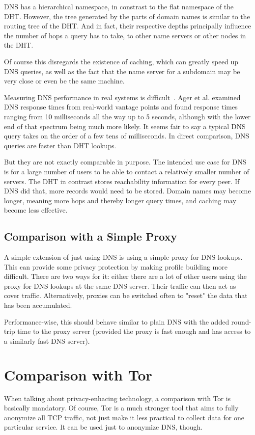 DNS has a hierarchical namespace, in constrast to the flat namespace of the DHT.
However, the tree generated by the parts of domain names is similar to the
routing tree of the DHT. And in fact, their respective depths principally
influence the number of hops a query has to take, to other name servers or other
nodes in the DHT.

Of course this disregards the existence of caching, which can greatly speed up
DNS queries, as well as the fact that the name server for a subdomain may be
very close or even be the same machine.

Measuring DNS performance in real systems is
difficult~\cite{liston2002diversity}. Ager et al.\cite{ager2010comparing}
examined DNS response times from real-world vantage points and found response
times ranging from 10 milliseconds all the way up to 5 seconds, although with
the lower end of that spectrum being much more likely. It seems fair to say a
typical DNS query takes on the order of a few tens of milliseconds. In direct
comparison, DNS queries are faster than DHT lookups.

But they are not exactly comparable in purpose. The intended use case for DNS is
for a large number of users to be able to contact a relatively smaller number of
servers. The DHT in contrast stores reachability information for every peer. If
DNS did that, more records would need to be stored. Domain names may become
longer, meaning more hops and thereby longer query times, and caching may become
less effective.

\subsection{Comparison with a Simple Proxy}
A simple extension of just using DNS is using a simple proxy for DNS lookups.
This can provide some privacy protection by making profile building more
difficult. There are two ways for it: either there are a lot of other users
using the proxy for DNS lookups at the same DNS server. Their traffic can then
act as cover traffic. Alternatively, proxies can be switched often to "reset"
the data that has been accumulated.

Performance-wise, this should behave similar to plain DNS with the added
round-trip time to the proxy server (provided the proxy is fast enough and has
access to a similarly fast DNS server).

\section{Comparison with Tor}
When talking about privacy-enhacing technology, a comparison with Tor is
basically mandatory. Of course, Tor is a much stronger tool that aims to fully
anonymize all TCP traffic, not just make it less practical to collect data for
one particular service. It can be used just to anonymize DNS, though.

